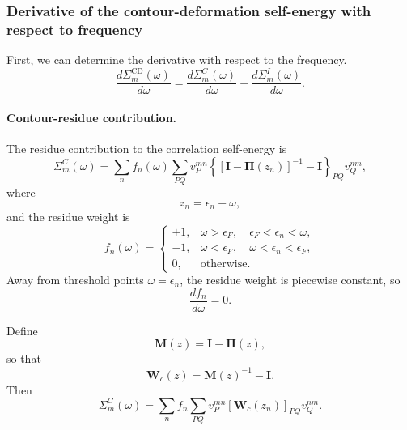 \subsubsection{Derivative of the contour-deformation self-energy with respect to frequency}
First, we can determine the derivative with respect to the frequency. 
\begin{equation}
    \frac{d\Sigma_m^{\mathrm{CD}}(\omega)}{d\omega}
    =
    \frac{d\Sigma_m^{C}(\omega)}{d\omega}
    +
    \frac{d\Sigma_m^{I}(\omega)}{d\omega}.
\end{equation}

\paragraph{Contour-residue contribution.}

The residue contribution to the correlation self-energy is
\begin{equation}
    \Sigma_m^C(\omega)
    =
    \sum_n f_n(\omega)
    \sum_{PQ}
    v_P^{mn}
    \left\{
    \left[
    \mathbf I-\boldsymbol{\Pi}(z_n)
    \right]^{-1}
    -
    \mathbf I
    \right\}_{PQ}
    v_Q^{nm},
\end{equation}
where
\begin{equation}
    z_n = \epsilon_n-\omega,
\end{equation}
and the residue weight is
\begin{equation}
    f_n(\omega)
    =
    \begin{cases}
    +1, & \omega>\epsilon_F,\quad \epsilon_F<\epsilon_n<\omega,\\
    -1, & \omega<\epsilon_F,\quad \omega<\epsilon_n<\epsilon_F,\\
    0, & \text{otherwise}.
    \end{cases}
\end{equation}
Away from threshold points \(\omega=\epsilon_n\), the residue weight is
piecewise constant, so
\begin{equation}
    \frac{d f_n}{d\omega}=0.
\end{equation}

Define
\begin{equation}
    \mathbf M(z)
    =
    \mathbf I-\boldsymbol{\Pi}(z),
\end{equation}
so that
\begin{equation}
    \mathbf W_c(z)
    =
    \mathbf M(z)^{-1}-\mathbf I.
\end{equation}
Then
\begin{equation}
    \Sigma_m^C(\omega)
    =
    \sum_n f_n
    \sum_{PQ}
    v_P^{mn}
    \left[
    \mathbf W_c(z_n)
    \right]_{PQ}
    v_Q^{nm}.
\end{equation}

